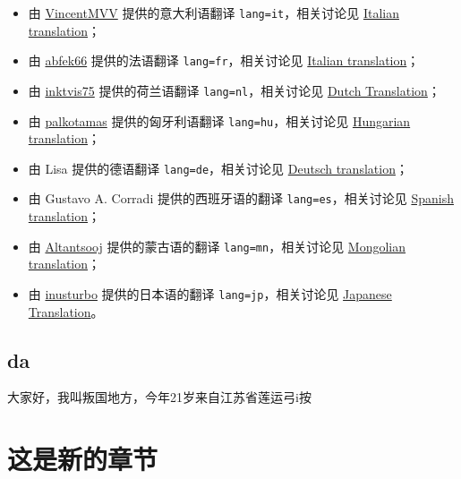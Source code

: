 \begin{itemize}
    \item 由 \href{https://github.com/VincentMVV}{VincentMVV} 提供的意大利语翻译 \lstinline{lang=it}，相关讨论见 \href{https://github.com/ElegantLaTeX/ElegantBook/issues/85}{Italian translation}；
    \item 由 \href{https://github.com/abfek66}{abfek66} 提供的法语翻译 \lstinline{lang=fr}，相关讨论见 \href{https://github.com/ElegantLaTeX/ElegantBook/issues/85}{Italian translation}；
    \item 由 \href{https://github.com/inktvis75}{inktvis75} 提供的荷兰语翻译 \lstinline{lang=nl}，相关讨论见 \href{https://github.com/ElegantLaTeX/ElegantBook/issues/108}{Dutch Translation}；
    \item 由 \href{https://github.com/palkotamas}{palkotamas} 提供的匈牙利语翻译 \lstinline{lang=hu}，相关讨论见 \href{https://github.com/ElegantLaTeX/ElegantBook/issues/111}{Hungarian translation}；
    \item 由 Lisa 提供的德语翻译 \lstinline{lang=de}，相关讨论见 \href{https://github.com/ElegantLaTeX/ElegantBook/issues/113}{Deutsch translation}；
    \item 由 Gustavo A. Corradi 提供的西班牙语的翻译 \lstinline{lang=es}，相关讨论见 \href{https://github.com/ElegantLaTeX/ElegantBook/issues/133}{Spanish translation}；
    \item 由 \href{https://github.com/Altantsooj}{Altantsooj} 提供的蒙古语的翻译 \lstinline{lang=mn}，相关讨论见 \href{https://github.com/ElegantLaTeX/ElegantBook/issues/137}{Mongolian translation}；
    \item 由 \href{https://github.com/inusturbo}{inusturbo} 提供的日本语的翻译 \lstinline{lang=jp}，相关讨论见 \href{https://github.com/ElegantLaTeX/ElegantBook/issues/172}{Japanese Translation}。
  \end{itemize}

  \section{da}
  大家好，我叫叛国地方，今年21岁来自江苏省莲运弓i按

  \chapter{这是新的章节}


  
